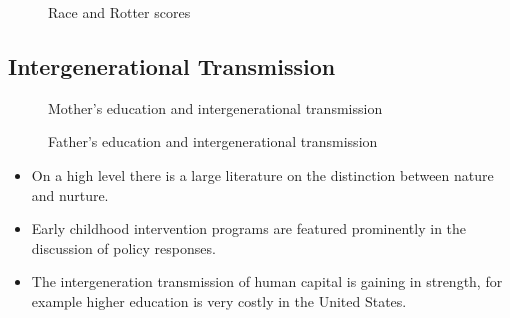 \begin{figure}[htp]\centering
\caption{Race and Rotter scores}
\end{figure}
\FloatBarrier\subsection{Intergenerational Transmission}
\begin{figure}[htp]\centering
\caption{Mother's education and intergenerational transmission}
\end{figure}

\begin{figure}[htp]\centering
\caption{Father's education and intergenerational transmission}
\end{figure}


\begin{itemize}
\item On a high level there is a large literature on the distinction between nature and nurture.
\item Early childhood intervention programs are featured prominently in the discussion of policy responses.
\item The intergeneration transmission of human capital is gaining in strength, for example higher education is very costly in the United States. 
\end{itemize}
